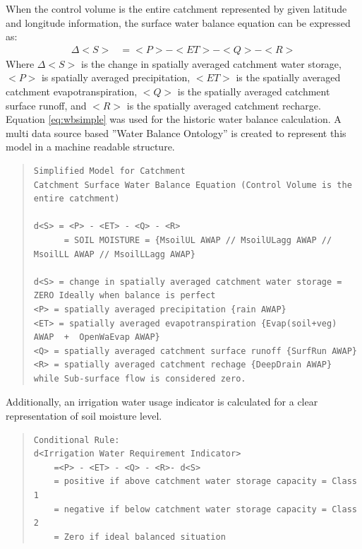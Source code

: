 \documentclass[12pt,journal,compsoc,onecolumn]{IEEEtran}
\begin{document}
\newline
When the control volume is the entire catchment represented by given latitude and longitude information, the surface water balance equation can be expressed as:
\begin{align}
	\Delta <S> &= <P> - <ET>-<Q>-<R>
	\label{eq:wbsimple}
\end{align}
Where $\Delta <S>$ is the change in spatially averaged catchment water storage,
$<P>$ is spatially averaged precipitation, $<ET>$ is the spatially averaged catchment
evapotranspiration, $<Q>$ is the spatially averaged catchment surface runoff, and $<R>$
is the spatially averaged catchment recharge. Equation \ref{eq:wbsimple} was used for the historic water balance calculation. A multi data source based ''Water Balance Ontology'' is created to represent this model in a machine readable structure.
\begin{quote}
	\begin{lstlisting}
Simplified Model for Catchment
Catchment Surface Water Balance Equation (Control Volume is the entire catchment)

d<S> = <P> - <ET> - <Q> - <R>
      = SOIL MOISTURE = {MsoilUL AWAP // MsoilULagg AWAP // MsoilLL AWAP // MsoilLLagg AWAP}

d<S> = change in spatially averaged catchment water storage = ZERO Ideally when balance is perfect
<P> = spatially averaged precipitation {rain AWAP}
<ET> = spatially averaged evapotranspiration {Evap(soil+veg) AWAP  +  OpenWaEvap AWAP}
<Q> = spatially averaged catchment surface runoff {SurfRun AWAP}
<R> = spatially averaged catchment rechage {DeepDrain AWAP} while Sub-surface flow is considered zero.
	\end{lstlisting}\label{quote:wb}
\end{quote}
Additionally, an irrigation water usage indicator is calculated for a clear representation of soil moisture level.
\begin{quote}
	\begin{lstlisting}
Conditional Rule:
d<Irrigation Water Requirement Indicator>
	=<P> - <ET> - <Q> - <R>- d<S>
	= positive if above catchment water storage capacity = Class 1
	= negative if below catchment water storage capacity = Class 2
	= Zero if ideal balanced situation
	\end{lstlisting}\label{quote:wb2}
\end{quote}
\end{document}
